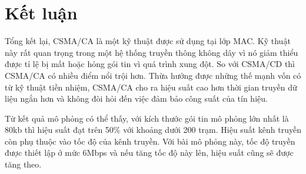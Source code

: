 \chapter{Kết luận}
\label{ch::chapter4}

Tổng kết lại, CSMA/CA là một kỹ thuật được sử dụng tại lớp MAC.
Kỹ thuật này rất quan trọng trong một hệ thống truyền thông không dây vì nó giảm thiểu được tỉ lệ bị mất hoặc hỏng gói tin vì quá trình xung đột.
So với CSMA/CD thì CSMA/CA có nhiều điểm nổi trội hơn. Thừa hưởng được những thế mạnh vốn có từ kỹ thuật tiền nhiệm, CSMA/CA cho ra hiệu suất cao hơn thời gian truyền dữ liệu ngắn hơn và
không đòi hỏi đến việc đảm bảo công suất của tín hiệu.

Từ kết quả mô phỏng có thể thấy, với kích thước gói tin mô phỏng lớn nhất là 80kb thì hiệu suất đạt trên 50\% với khoảng dưới 200 trạm.
Hiệu suất kênh truyền còn phụ thuộc vào tốc độ của kênh truyền. Với bài mô phỏng này, tốc độ truyền được thiết lập ở mức 6Mbps và nếu tăng tốc độ này lên, hiệu suất cũng sẽ được tăng theo.